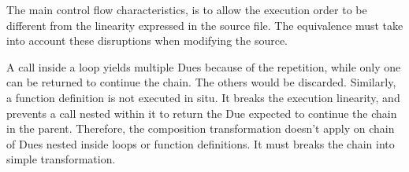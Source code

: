 \begin{figure}[h!]
\end{figure}

The main control flow characteristics, is to allow the execution order to be different from the linearity expressed in the source file.
The equivalence must take into account these disruptions when modifying the source.

A call inside a loop yields multiple Dues because of the repetition, while only one can be returned to continue the chain.
The others would be discarded.
Similarly, a function definition is not executed in situ.
It breaks the execution linearity, and prevents a call nested within it to return the Due expected to continue the chain in the parent.
Therefore, the composition transformation doesn't apply on chain of Dues nested inside loops or function definitions.
It must breaks the chain into simple transformation.

